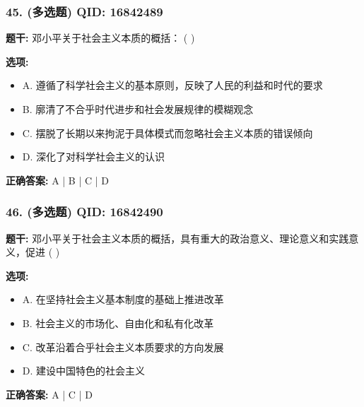 \documentclass[12pt,UTF8]{ctexart}
\begin{document}
\subsubsection*{45. (多选题) \small QID: 16842489}

\textbf{题干:}
邓小平关于社会主义本质的概括： ( )

\textbf{选项:}
\begin{itemize}[leftmargin=*]

  \item A. 遵循了科学社会主义的基本原则，反映了人民的利益和时代的要求

  \item B. 廓清了不合乎时代进步和社会发展规律的模糊观念

  \item C. 摆脱了长期以来拘泥于具体模式而忽略社会主义本质的错误倾向

  \item D. 深化了对科学社会主义的认识

\end{itemize}

\textbf{正确答案:}
A | B | C | D

\vspace{0.3em}\hrulefill\vspace{0.7em}

\subsubsection*{46. (多选题) \small QID: 16842490}

\textbf{题干:}
邓小平关于社会主义本质的概括，具有重大的政治意义、理论意义和实践意义，促进 ( )

\textbf{选项:}
\begin{itemize}[leftmargin=*]

  \item A. 在坚持社会主义基本制度的基础上推进改革

  \item B. 社会主义的市场化、自由化和私有化改革

  \item C. 改革沿着合乎社会主义本质要求的方向发展

  \item D. 建设中国特色的社会主义

\end{itemize}

\textbf{正确答案:}
A | C | D

\vspace{0.3em}\hrulefill\vspace{0.7em}
\end{document}
